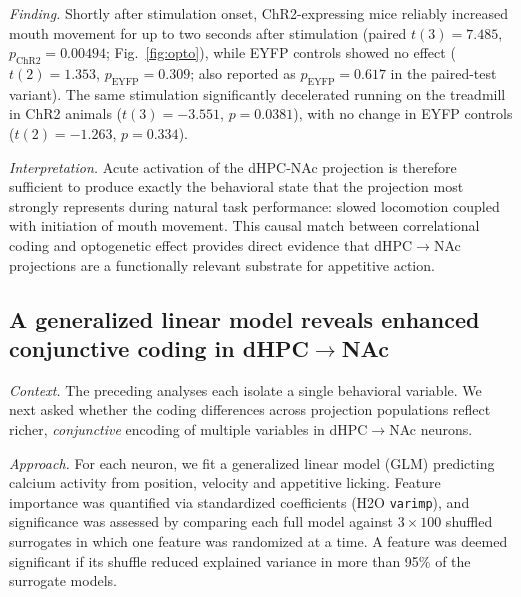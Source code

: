 \documentclass[11pt]{article}
\begin{document}
\textit{Finding.} Shortly after stimulation onset, ChR2-expressing mice reliably increased mouth movement for up to two seconds after stimulation (paired $t(3)=7.485$, $p_{\text{ChR2}}=0.00494$; Fig.~\ref{fig:opto}), while EYFP controls showed no effect ($t(2)=1.353$, $p_{\text{EYFP}}=0.309$; also reported as $p_{\text{EYFP}}=0.617$ in the paired-test variant). The same stimulation significantly decelerated running on the treadmill in ChR2 animals ($t(3)=-3.551$, $p=0.0381$), with no change in EYFP controls ($t(2)=-1.263$, $p=0.334$).

\textit{Interpretation.} Acute activation of the dHPC-NAc projection is therefore sufficient to produce exactly the behavioral state that the projection most strongly represents during natural task performance: slowed locomotion coupled with initiation of mouth movement. This causal match between correlational coding and optogenetic effect provides direct evidence that dHPC$\rightarrow$NAc projections are a functionally relevant substrate for appetitive action.

\subsection{A generalized linear model reveals enhanced conjunctive coding in dHPC$\rightarrow$NAc}

\textit{Context.} The preceding analyses each isolate a single behavioral variable. We next asked whether the coding differences across projection populations reflect richer, \emph{conjunctive} encoding of multiple variables in dHPC$\rightarrow$NAc neurons.

\textit{Approach.} For each neuron, we fit a generalized linear model (GLM) predicting calcium activity from position, velocity and appetitive licking. Feature importance was quantified via standardized coefficients (H2O \texttt{varimp}), and significance was assessed by comparing each full model against $3\times100$ shuffled surrogates in which one feature was randomized at a time. A feature was deemed significant if its shuffle reduced explained variance in more than 95\% of the surrogate models.
\end{document}
